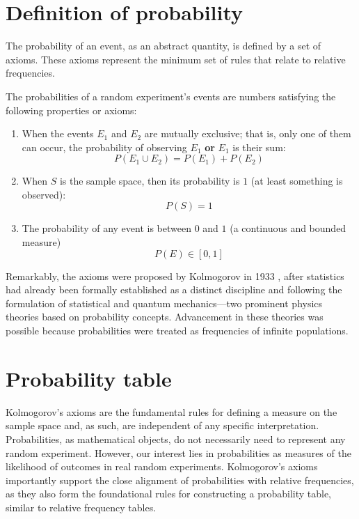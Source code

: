 \documentclass[
]{book}
\begin{document}
\hypertarget{definition-of-probability}{%
\section{Definition of probability}\label{definition-of-probability}}

The probability of an event, as an abstract quantity, is defined by a set of axioms. These axioms represent the minimum set of rules that relate to relative frequencies.

The probabilities of a random experiment's events are numbers satisfying the following properties or axioms:

\begin{enumerate}
\def\labelenumi{\arabic{enumi})}
\item
  When the events \(E_1\) and \(E_2\) are mutually exclusive; that is, only one of them can occur, the probability of observing \(E_1\) \textbf{or} \(E_1\) is their sum:
  \[ P( E_1\cup E_2) = P(E_1) + P(E_2)\]
\item
  When \(S\) is the sample space, then its probability is \(1\) (at least something is observed): \[P(S)=1\]
\item
  The probability of any event is between \(0\) and \(1\) (a continuous and bounded measure) \[P(E) \in [0,1]\]
\end{enumerate}

Remarkably, the axioms were proposed by Kolmogorov in 1933 \citep{kolmogorov2013foundations}, after statistics had already been formally established as a distinct discipline and following the formulation of statistical and quantum mechanics---two prominent physics theories based on probability concepts. Advancement in these theories was possible because probabilities were treated as frequencies of infinite populations.

\hypertarget{probability-table}{%
\section{Probability table}\label{probability-table}}

Kolmogorov's axioms are the fundamental rules for defining a measure on the sample space and, as such, are independent of any specific interpretation. Probabilities, as mathematical objects, do not necessarily need to represent any random experiment. However, our interest lies in probabilities as measures of the likelihood of outcomes in real random experiments. Kolmogorov's axioms importantly support the close alignment of probabilities with relative frequencies, as they also form the foundational rules for constructing a probability table, similar to relative frequency tables.
\end{document}
